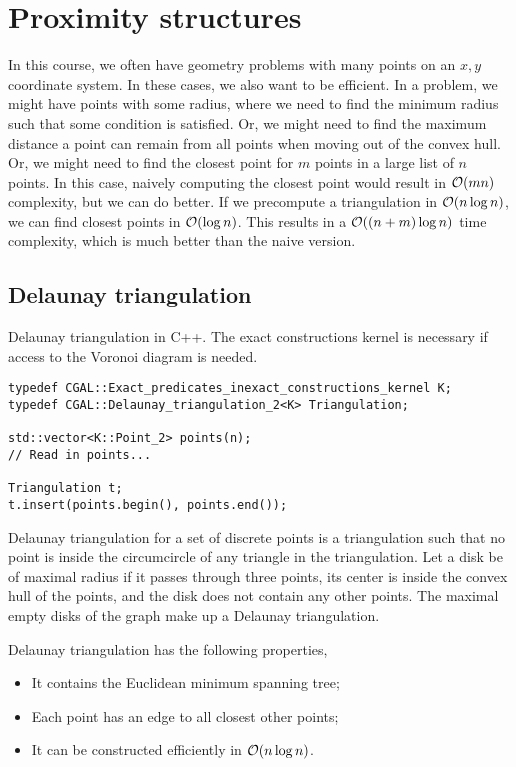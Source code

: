 \documentclass[justified,nobib]{tufte-handout}
\begin{document}
\section{Proximity structures}

In this course, we often have geometry problems with many points on an $x,y$
coordinate system. In these cases, we also want to be efficient. In a problem,
we might have points with some radius, where we need to find the minimum radius
such that some condition is satisfied. Or, we might need to find the maximum
distance a point can remain from all points when moving out of the convex hull.
Or, we might need to find the closest point for $m$ points in a large list of
$n$ points. In this case, naively computing the closest point would result in
$\bigo{mn}$ complexity, but we can do better. If we precompute a triangulation
in $\bigo{n \log n}$, we can find closest points in $\bigo{\log n}$. This
results in a $\bigo{(n+m) \log n}$ time complexity, which is much better than
the naive version.

\subsection{Delaunay triangulation}

\begin{listing}
    \caption{Delaunay triangulation in C++. The exact constructions kernel is
        necessary if access to the Voronoi diagram is needed.}
    \label{lst:dt}

    \begin{lstlisting}
typedef CGAL::Exact_predicates_inexact_constructions_kernel K;
typedef CGAL::Delaunay_triangulation_2<K> Triangulation;

std::vector<K::Point_2> points(n);
// Read in points...

Triangulation t;
t.insert(points.begin(), points.end());
  \end{lstlisting}
\end{listing}

Delaunay triangulation for a set of discrete points is a triangulation such
that no point is inside the circumcircle of any triangle in the triangulation.
Let a disk be of maximal radius if it passes through three points, its center
is inside the convex hull of the points, and the disk does not contain any other
points. The maximal empty disks of the graph make up a Delaunay triangulation.

Delaunay triangulation has the following properties,
\begin{itemize}
    \item It contains the Euclidean minimum spanning tree;
    \item Each point has an edge to all closest other points;
    \item It can be constructed efficiently in $\bigo{n \log n}$.
\end{itemize}
\end{document}
